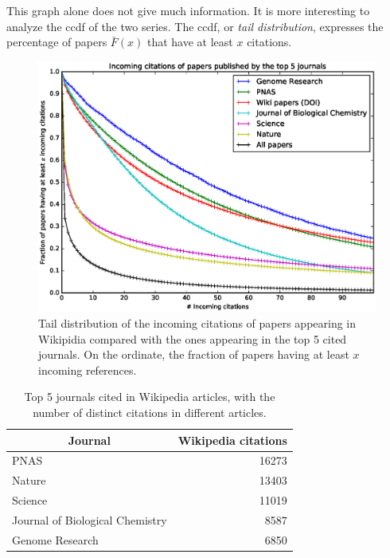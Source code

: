 This graph alone does not give much information.
It is more interesting to analyze the \ac{ccdf} of the two series.
The \ac{ccdf}, or \emph{tail distribution}, expresses the percentage of papers $\bar{F}(x)$ that have at least $x$ citations.

\begin{figure}[h]
\centering
\includegraphics[keepaspectratio=true, width=\textwidth]{assets/incoming_citations_distribution_ccdf}
\caption{Tail distribution of the incoming citations of papers appearing in Wikipidia compared with the ones appearing in the top 5 cited journals.
On the ordinate, the fraction of papers having at least $x$ incoming references.}
\label{fig:incoming_citations_distribution_ccdf}
\end{figure}

\begin{table}[]
\centering
\begin{tabular}{@{}lr@{}}
\toprule
\multicolumn{1}{c}{\textbf{Journal}} & \textbf{Wikipedia citations} \\ \midrule
PNAS                                 & 16273                        \\
Nature                               & 13403                        \\
Science                              & 11019                        \\
Journal of Biological Chemistry      & 8587                         \\
Genome Research                      & 6850                         \\ \bottomrule
\end{tabular}
\caption{Top 5 journals cited in Wikipedia articles, with the number of distinct citations in different articles.}
\label{tbl:top_cited_wikipedia_journals}
\end{table}

